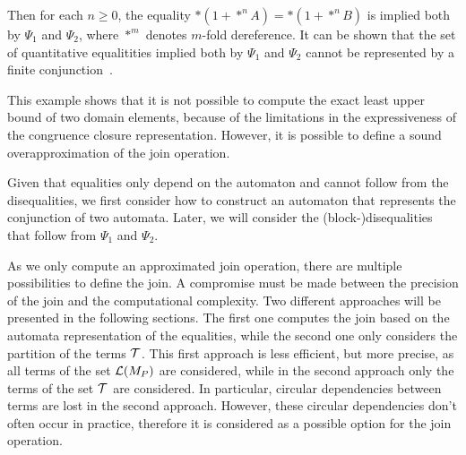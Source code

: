 \begin{example}
\begin{center}
\begin{minipage}{0.65\textwidth}
      \end{minipage}
    \end{center}

    Then for each $n \geq 0$, the equality $*(1+*^n A) = *(1 + *^n B)$ is implied both by $\Psi_1$ and $\Psi_2$, where $*^m$ denotes $m$-fold dereference.
    It can be shown that the set of quantitative equalitities implied both by $\Psi_1$ and $\Psi_2$ cannot be represented by a finite conjunction~\cite{join, 2pointer}.
\end{example}

This example shows that it is not possible to compute the exact least upper bound of two domain elements,
because of the limitations in the expressiveness of the congruence closure representation.
However, it is possible to define a sound overapproximation of the join operation.

Given that equalities only depend on the automaton and cannot follow from the disequalities, we first consider how to construct an automaton that represents the conjunction of two automata.
Later, we will consider the (block-)disequalities that follow from $\Psi_1$ and $\Psi_2$.

As we only compute an approximated join operation, there are multiple possibilities to define the join.
A compromise must be made between the precision of the join and the computational complexity.
Two different approaches will be presented in the following sections.
The first one computes the join based on the automata representation of the equalities,
while the second one only considers the partition of the terms $\mathcal{T}$.
This first approach is less efficient, but more precise,
as all terms of the set $\mathcal{L}(M_P)$ are considered, while in the second approach only the terms of the set $\mathcal{T}$ are considered.
In particular, circular dependencies between terms are lost in the second approach.
However, these circular dependencies don't often occur in practice, therefore it is
considered as a possible option for the join operation.

